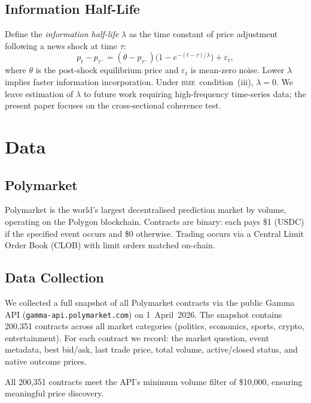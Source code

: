 \documentclass[12pt,a4paper]{article}
\theoremstyle{definition}
\theoremstyle{remark}
\newcommand{\BME}{\textsc{bme}}
\begin{document}
\subsection{Information Half-Life}
\label{sec:halflife}

Define the \emph{information half-life} $\lambda$ as the time constant of
price adjustment following a news shock at time $\tau$:
\begin{equation}
  p_t - p_{\tau^-} = (\theta - p_{\tau^-})\bigl(1 - e^{-(t-\tau)/\lambda}\bigr) + \varepsilon_t,
  \label{eq:halflife}
\end{equation}
where $\theta$ is the post-shock equilibrium price and $\varepsilon_t$ is
mean-zero noise.
Lower $\lambda$ implies faster information incorporation.
Under \BME\ condition~(iii), $\lambda = 0$.
We leave estimation of $\lambda$ to future work requiring high-frequency
time-series data; the present paper focuses on the cross-sectional coherence
test.

\section{Data}
\label{sec:data}

\subsection{Polymarket}

Polymarket is the world's largest decentralised prediction market by volume,
operating on the Polygon blockchain.
Contracts are binary: each pays \$1 (USDC) if the specified event occurs and
\$0 otherwise.
Trading occurs via a Central Limit Order Book (CLOB) with limit orders matched
on-chain.

\subsection{Data Collection}

We collected a full snapshot of all Polymarket contracts via the public
Gamma API (\texttt{gamma-api.polymarket.com}) on 1~April~2026.
The snapshot contains 200{,}351 contracts across all market categories
(politics, economics, sports, crypto, entertainment).
For each contract we record: the market question, event metadata, best
bid/ask, last trade price, total volume, active/closed status, and native
outcome prices.

All 200{,}351 contracts meet the API's minimum volume filter of \$10{,}000,
ensuring meaningful price discovery.
\end{document}
